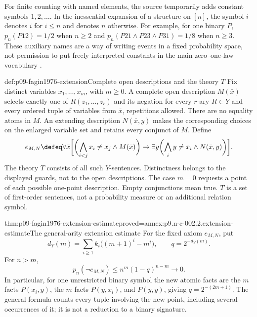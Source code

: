 For finite counting with named elements, the source temporarily adds
constant symbols \(1,2,\ldots\).  In the inessential expansion of a
structure on \([n]\), the symbol \(i\) denotes \(i\) for \(i\leq n\)
and denotes \(n\) otherwise.  For example, for one binary \(P\),
\(p_n(P12)=1/2\) when \(n\geq2\) and
\(p_n(P21\land P23\land P31)=1/8\) when \(n\geq3\).
These auxiliary names are a way of writing events in a fixed probability
space, not permission to put freely interpreted constants in the main
zero--one-law vocabulary \cite[pp.~50--51]{Fagin1976}.

\begin{hbdefinition}{def:p09-fagin1976-extension}{Complete open descriptions and the theory \(T\)}
Fix distinct variables \(x_1,\ldots,x_m\), with \(m\geq0\).
A complete open description \(M(\bar x)\) selects exactly one of
\(R(z_1,\ldots,z_r)\) and its negation for every \(r\)-ary \(R\in Y\)
and every ordered tuple of variables from \(\bar x\), repetitions allowed.
There are no equality atoms in \(M\).  An extending description
\(N(\bar x,y)\) makes the corresponding choices on the enlarged variable
set and retains every conjunct of \(M\).
Define
\[
\begin{split}
 e_{M,N}\defeq\forall\bar x\biggl[
  \biggl(\bigwedge_{i<j}x_i\ne x_j\land M(\bar x)\biggr)
  \to\exists y\biggl(\bigwedge_i y\ne x_i\land N(\bar x,y)\biggr)
 \biggr].
\end{split}
\]
The theory \(T\) consists of all such \(Y\)-sentences.  Distinctness
belongs to the displayed guards, not to the open descriptions.  The case
\(m=0\) requests a point of each possible one-point description.
Empty conjunctions mean true.  \(T\) is a set of first-order sentences,
not a probability measure or an additional relation symbol.
\end{hbdefinition}

\begin{hblemma}{thm:p09-fagin1976-extension-estimate}{proved=annex:p9.n-c-002.2.extension-estimate}{The general-arity extension estimate}
For the fixed axiom \(e_{M,N}\), put
\[
 d_Y(m)=\sum_{i\geq1}k_i\bigl((m+1)^i-m^i\bigr),
 \qquad q=2^{-d_Y(m)}.
\]
For \(n>m\),
\[
 p_n(\neg e_{M,N})\leq n^m(1-q)^{n-m}\longrightarrow0.
\]
In particular, for one unrestricted binary symbol the new atomic facts
are the \(m\) facts \(P(x_i,y)\), the \(m\) facts \(P(y,x_i)\),
and \(P(y,y)\), giving \(q=2^{-(2m+1)}\).
The general formula counts every tuple involving the new point, including
several occurrences of it; it is not a reduction to a binary signature.
\end{hblemma}

